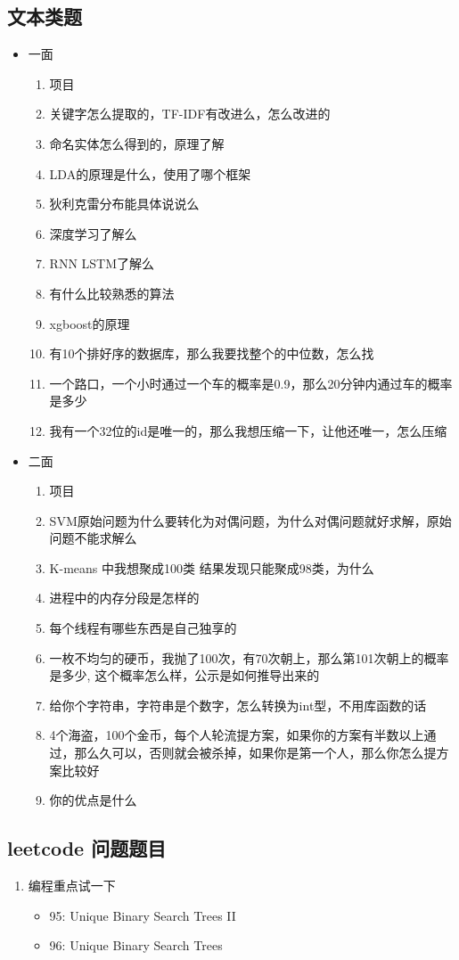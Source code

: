 \documentclass[11pt]{article}
\begin{document}
\subsection{文本类题}
\label{sec-6-1}
\begin{itemize}
\item 一面
\begin{enumerate}
\item 项目
\item 关键字怎么提取的，TF-IDF有改进么，怎么改进的
\item 命名实体怎么得到的，原理了解
\item LDA的原理是什么，使用了哪个框架
\item 狄利克雷分布能具体说说么
\item 深度学习了解么
\item RNN LSTM了解么
\item 有什么比较熟悉的算法
\item xgboost的原理
\item 有10个排好序的数据库，那么我要找整个的中位数，怎么找
\item 一个路口，一个小时通过一个车的概率是0.9，那么20分钟内通过车的概率是多少
\item 我有一个32位的id是唯一的，那么我想压缩一下，让他还唯一，怎么压缩
\end{enumerate}

\item 二面
\begin{enumerate}
\item 项目
\item SVM原始问题为什么要转化为对偶问题，为什么对偶问题就好求解，原始问题不能求解么
\item K-means 中我想聚成100类 结果发现只能聚成98类，为什么
\item 进程中的内存分段是怎样的
\item 每个线程有哪些东西是自己独享的
\item 一枚不均匀的硬币，我抛了100次，有70次朝上，那么第101次朝上的概率是多少, 这个概率怎么样，公示是如何推导出来的
\item 给你个字符串，字符串是个数字，怎么转换为int型，不用库函数的话
\item 4个海盗，100个金币，每个人轮流提方案，如果你的方案有半数以上通过，那么久可以，否则就会被杀掉，如果你是第一个人，那么你怎么提方案比较好
\item 你的优点是什么
\end{enumerate}
\end{itemize}

\subsection{leetcode 问题题目}
\label{sec-6-2}
\begin{enumerate}
\item 编程重点试一下
\begin{itemize}
\item 95: Unique Binary Search Trees II
\item 96: Unique Binary Search Trees
\end{itemize}
\end{enumerate}
\end{document}
